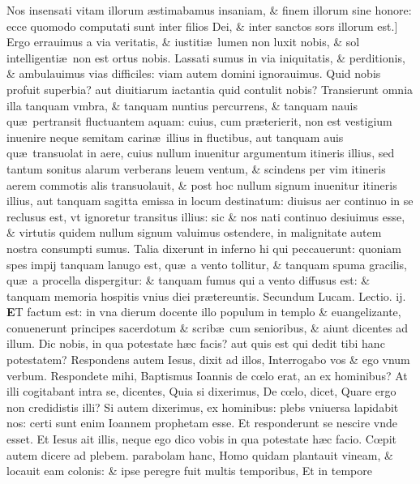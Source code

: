 \documentclass[a5paper,10pt]{book}
\def\leftmarginnote{%
	\lrmarginnote{\hskip -\marginparsep \hskip -6.5em}}
\def\rightmarginnote{%
	\lrmarginnote{\hskip\columnwidth \hskip -1em}}
\def\ae{æ}
\def\oe{œ}
\begin{document}
\begin{multicols*}{2}
Nos insensati vitam illorum \ae stimabamus insaniam, \& finem illorum sine honore: ecce quomodo computati sunt inter filios Dei, \& inter sanctos sors
illorum est.]
Ergo\rightmarginnote{B} errauimus a via veritatis, \& iustiti\ae \ lumen non luxit nobis, \& sol intelligenti\ae \ non est ortus nobis.
Lassati sumus in via iniquitatis, \& perditionis, \& ambulauimus vias difficiles: viam autem domini ignorauimus.
Quid nobis profuit superbia? aut diuitiarum iactantia quid contulit nobis?
Transierunt omnia illa tanquam vmbra, \& tanquam nuntius percurrens, \& tanquam nauis qu\ae \ pertransit fluctuantem aquam: cuius, cum pr\ae terierit, non est vestigium inuenire neque semitam carin\ae \ illius in fluctibus, aut tanquam auis qu\ae \ transuolat in aere, cuius nullum inuenitur argumentum itineris illius, sed tantum sonitus alarum verberans leuem ventum, \& scindens per vim itineris aerem commotis alis transuolauit, \& post hoc nullum signum inuenitur itineris illius, aut tanquam sagitta emissa in locum destinatum: diuisus aer continuo in se reclusus est, vt ignoretur transitus illius: sic \& nos nati continuo desiuimus esse, \& virtutis quidem nullum signum valuimus ostendere, in malignitate autem nostra consumpti sumus.
Talia dixerunt in inferno hi qui peccauerunt: quoniam spes impij tanquam lanugo est, qu\ae \ a vento tollitur, \& tanquam spuma gracilis, qu\ae \ a procella dispergitur: \& tanquam fumus qui a vento diffusus est: \& tanquam memoria hospitis vnius diei pr\ae tereuntis.
\newline \color{red} Secundum Lucam. \hfill Lectio. ij. \color{black}
\vspace{-.25em}
\lettrine[lines=2]{\bfseries \color{red} E}{}T\leftmarginnote{\begin{flushright}c. 20.\end{flushright}} factum est: in vna dierum docente illo populum in templo \& euangelizante, conuenerunt principes sacerdotum \& scrib\ae \ cum senioribus, \& aiunt dicentes ad illum.
Dic nobis, in qua potestate h\ae c facis? aut quis est qui dedit tibi hanc potestatem?
Respondens autem Iesus, dixit ad illos, Interrogabo vos \& ego vnum verbum. Respondete mihi, Baptismus Ioannis de c\oe lo erat, an ex hominibus?
At illi cogitabant intra se, dicentes, Quia si dixerimus, De c\oe lo, dicet, Quare ergo non credidistis illi?
Si autem dixerimus, ex hominibus: plebs vniuersa lapidabit nos: certi sunt enim Ioannem prophetam esse. Et responderunt se nescire vnde esset.
Et Iesus ait illis, neque ego dico vobis in qua potestate h\ae c facio. C\oe pit autem dicere ad plebem. parabolam hanc, Homo quidam plantauit vineam, \& locauit eam colonis: \& ipse peregre fuit multis temporibus, Et in tempore

\end{multicols*}
\end{document}

